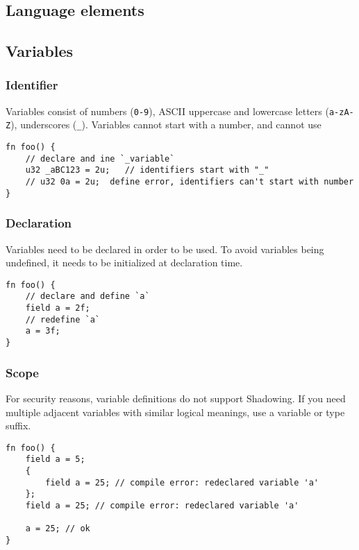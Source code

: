 \subsection{Language elements}\label{section: ola-lang-language-elements}


\subsection{Variables}

\subsubsection{Identifier}

Variables consist of numbers (\texttt{0-9}), ASCII uppercase and lowercase letters (\texttt{a-zA-Z}), underscores (\texttt{\_}).
Variables cannot start with a number, and cannot use 

\begin{lstlisting}
fn foo() {
    // declare and ine `_variable`
    u32 _aBC123 = 2u;   // identifiers start with "_"
    // u32 0a = 2u;  define error, identifiers can't start with number
}
\end{lstlisting}

\subsubsection{Declaration}

Variables need to be declared in order to be used. To avoid variables being undefined, it needs to be initialized at declaration time. 

\begin{lstlisting}
fn foo() {
    // declare and define `a`
    field a = 2f;
    // redefine `a`
    a = 3f;
}
\end{lstlisting}

\subsubsection{Scope}

For security reasons, variable definitions do not support Shadowing. 
If you need multiple adjacent variables with similar logical meanings, use a variable or type suffix.

\begin{lstlisting}
fn foo() {
    field a = 5;
    {        
        field a = 25; // compile error: redeclared variable 'a'
    };    
    field a = 25; // compile error: redeclared variable 'a'

    a = 25; // ok
}
\end{lstlisting}

